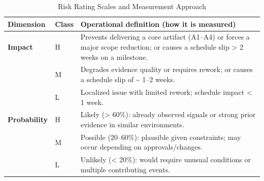 \begin{table}[htbp]
\centering
\caption{Risk Rating Scales and Measurement Approach}
\label{tab:risk_scales}
\footnotesize
\begin{tabular}{@{}p{}p{}p{}@{}}
	\toprule
	\textbf{Dimension} & \textbf{Class} & \textbf{Operational definition (how it is measured)} \\
\midrule
	\textbf{Impact} & H & Prevents delivering a core artifact (A1--A4) or forces a major scope reduction; or causes a schedule slip \textgreater{} 2 weeks on a milestone. \\
 & M & Degrades evidence quality or requires rework; or causes a schedule slip of \textasciitilde{} 1--2 weeks. \\
 & L & Localized issue with limited rework; schedule impact \textless{} 1 week. \\
\addlinespace
	\textbf{Probability} & H & Likely (\textgreater{} 60\%): already observed signals or strong prior evidence in similar environments. \\
 & M & Possible (20--60\%): plausible given constraints; may occur depending on approvals/changes. \\
 & L & Unlikely (\textless{} 20\%): would require unusual conditions or multiple contributing events. \\
\bottomrule
\end{tabular}
\end{table}


